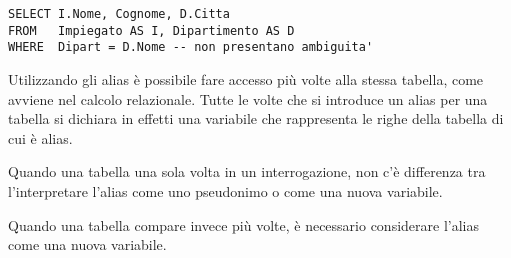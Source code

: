 \begin{lstlisting}
SELECT I.Nome, Cognome, D.Citta
FROM   Impiegato AS I, Dipartimento AS D
WHERE  Dipart = D.Nome -- non presentano ambiguita'
\end{lstlisting}

Utilizzando gli alias è possibile fare accesso più volte alla stessa tabella, come avviene nel calcolo relazionale. Tutte le volte che si introduce un alias per una tabella si dichiara in effetti una variabile che rappresenta le righe della tabella di cui è alias.

\medskip
Quando una tabella una sola volta in un interrogazione, non c'è differenza tra l'interpretare l'alias come uno pseudonimo o come una nuova variabile.

\medskip
Quando una tabella compare invece più volte, è necessario considerare l'alias come una nuova variabile.
